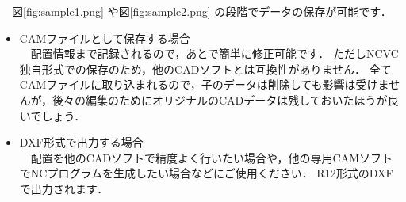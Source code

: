 

\vspace*{1zh}
　図\ref{fig:sample1.png} や図\ref{fig:sample2.png} の段階でデータの保存が可能です．

\begin{itemize}
\item CAMファイルとして保存する場合\\
　配置情報まで記録されるので，あとで簡単に修正可能です．
ただしNCVC独自形式での保存のため，他のCADソフトとは互換性がありません．
全てCAMファイルに取り込まれるので，子のデータは削除しても影響は受けませんが，後々の編集のためにオリジナルのCADデータは残しておいたほうが良いでしょう．
\item DXF形式で出力する場合\\
　配置を他のCADソフトで精度よく行いたい場合や，他の専用CAMソフトでNCプログラムを生成したい場合などにご使用ください．
R12形式のDXFで出力されます．
\end{itemize}